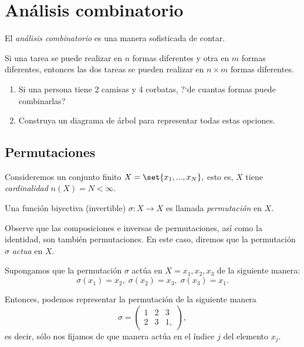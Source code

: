 \section{Análisis combinatorio}

El \emph{análisis combinatorio} es una manera sofisticada de contar.

\begin{proposicion}
	Si una tarea se puede realizar en $n$ formas diferentes y otra en $m$ formas diferentes, entonces las dos tareas se pueden realizar en $n\times m$ formas diferentes.	
\end{proposicion}

\begin{ejemplo}
	\label{exmp:1.14}
\end{ejemplo}
\begin{enumerate}
	\item Si una persona tiene 2 camisas y 4 corbatas, ?`de cuantas formas puede combinarlas?
	\item Construya un diagrama de árbol para representar todas estas opciones.
\end{enumerate}

\subsection{Permutaciones}

Consideremos un conjunto finito $X=\set{x_{1},...,x_{N}},$ esto es, $X$ tiene \emph{cardinalidad} $n(X)=N < \infty.$

Una función biyectiva (invertible) $\sigma:X \to X$ es llamada \emph{permutación} en $X.$

Observe que las composiciones e inversas de permutaciones, así como la identidad, son tambi\'en permutaciones. En este caso, diremos que la permutación $\sigma$ \emph{actua} en $X.$

Supongamos que la permutación $\sigma$ actúa en $X={x_{1},x_{2},x_{3}}$ de la siguiente manera:
$$
\sigma(x_{1})=x_{2}, \; \sigma(x_{2})=x_{3}, \; \sigma(x_{3})=x_{1}.
$$

Entonces, podemos representar la permutación de la siguiente manera
$$\sigma=
\begin{pmatrix}
	1 & 2 & 3 \\
	2 & 3 & 1,
\end{pmatrix},
$$  es decir, sólo nos fijamos de que manera actúa en el índice $j$ del elemento $x_{j}.$



